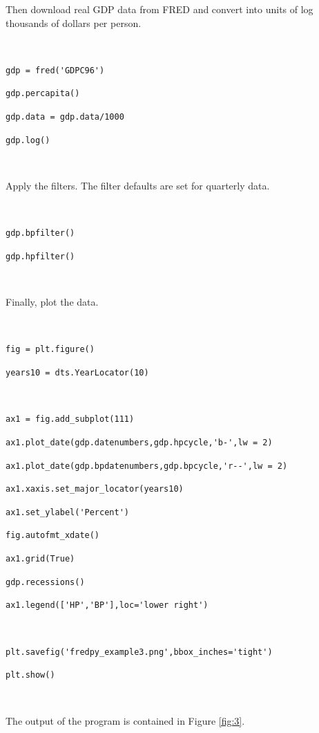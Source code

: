 \documentclass[11pt,fleqn]{article}
\newcommand{\ttt}{\texttt}
\begin{document}
\noindent Then download real GDP data from FRED and convert into units of log thousands of dollars per person.

\

\begin{minipage}{6.5in}
\verb!gdp = fred('GDPC96')!

\ttt{gdp.percapita()}

\ttt{gdp.data = gdp.data/1000}

\ttt{gdp.log()}

\

\end{minipage}

\noindent Apply the filters. The filter defaults are set for quarterly data.

\

\begin{minipage}{6in}
\ttt{gdp.bpfilter()}

\ttt{gdp.hpfilter()}

\

\end{minipage}

\noindent Finally, plot the data.

\

\begin{minipage}{6in}
\ttt{fig = plt.figure()}

\ttt{years10  = dts.YearLocator(10)}

\

\verb!ax1 = fig.add_subplot(111)!

\verb!ax1.plot_date(gdp.datenumbers,gdp.hpcycle,'b-',lw = 2)!

\verb!ax1.plot_date(gdp.bpdatenumbers,gdp.bpcycle,'r--',lw = 2)!

\verb!ax1.xaxis.set_major_locator(years10)!

\verb!ax1.set_ylabel('Percent')!

\verb!fig.autofmt_xdate()!

\ttt{ax1.grid(True)}

\ttt{gdp.recessions()}

\verb!ax1.legend(['HP','BP'],loc='lower right')!

\

\verb!plt.savefig('fredpy_example3.png',bbox_inches='tight')!

\ttt{plt.show()}

\

\end{minipage}

\noindent The output of the program is contained in Figure \ref{fig:3}.
\end{document}
